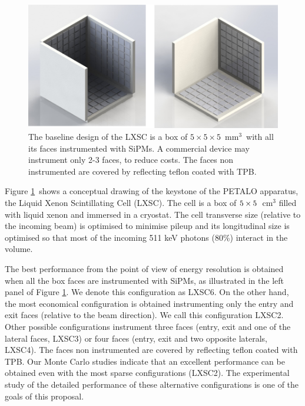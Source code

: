 \label{sec.lxsc}

\begin{figure}[!htb]
	\centering
	\includegraphics[scale=0.5]{img/lxsc.png}
	\caption{\label{fig.box} The baseline design of the LXSC is a box of 
	$5\times 5 \times 5$~mm$^3$~with all its faces instrumented with SiPMs. A commercial device may instrument only 2-3 faces, to reduce costs. The faces non instrumented are covered by reflecting teflon coated with TPB. }
\end{figure}

Figure \ref{fig.box}~shows a conceptual drawing of the keystone of the PETALO apparatus, the Liquid Xenon Scintillating Cell (LXSC). The cell is a box of $5\times 5 \time 5$~cm$^3$ filled with liquid xenon and immersed in a cryostat. The cell transverse size (relative to the incoming beam) is optimised to minimise pileup and its longitudinal size is optimised so that most of the incoming 511 keV photons (80\%) interact in the volume. 

The best performance from the point of view of energy resolution is obtained when all the box faces are instrumented with SiPMs, as illustrated in the left panel of Figure \ref{fig.box}. We denote this configuration as LXSC6. On the other hand, the most economical configuration is obtained instrumenting only the entry and exit faces (relative to the beam direction). We call this configuration LXSC2. Other possible configurations instrument three faces (entry, exit and one of the lateral faces, LXSC3) or four faces (entry, exit and two opposite laterals, LXSC4). The faces non instrumented are covered by reflecting teflon coated with TPB. Our Monte Carlo studies indicate that an excellent performance can be obtained even with the most sparse configurations (LXSC2). The experimental study of the detailed performance of these alternative configurations is one of the goals of this proposal.  

